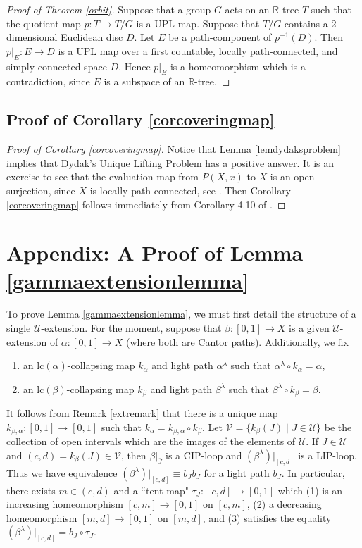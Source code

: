 \documentclass[12pt, leqno]{amsart}
\newcommand{\light}{\lambda}
\newcommand{\ui}{[0,1]}
\newcommand{\scru}{\mathscr{U}}
\newcommand{\scrv}{\mathscr{V}}
\newcommand{\ov}{\overline}
\newcommand{\lc}{\text{lc}}
\theoremstyle{definition}\newtheorem{definition}[theorem]{Definition}
\begin{document}
\begin{proof}[Proof of Theorem \ref{orbit}]
  Suppose that a group $G$ acts on an $\mathbb R$-tree $T$ such that the quotient map $p:T \to T/G$ is a UPL map.  Suppose that $T/G$ contains a 2-dimensional Euclidean disc $D$.  Let $E$ be a path-component of $p^{-1}(D)$.  Then $p|_{E}:E \to D$ is a UPL map over a first countable, locally path-connected, and simply connected space $D$.  Hence $p|_{E}$ is a homeomorphism which is a contradiction, since $E$ is a subspace of an $\mathbb R$-tree.
\end{proof}

\subsection{Proof of Corollary \ref{corcoveringmap}}

\begin{proof}[Proof of Corollary \ref{corcoveringmap}]
    Notice that Lemma \ref{lemdydaksproblem} implies that Dydak's Unique Lifting Problem has a positive answer.  It is an exercise to see that the evaluation map from $P(X,x)$ to $X$ is an open surjection, since $X$ is locally path-connected, see \cite[Section 2.1]{BM}.  Then Corollary \ref{corcoveringmap} follows immediately from Corollary 4.10 of \cite{BM}.
\end{proof}


\section{Appendix: A Proof of Lemma \ref{gammaextensionlemma}}\label{appendix}

To prove Lemma \ref{gammaextensionlemma}, we must first detail the structure of a single $\scru$-extension. For the moment, suppose that $\beta:\ui\to X$ is a given $\scru$-extension of $\alpha:\ui\to X$ (where both are Cantor paths). Additionally, we fix
\begin{enumerate}
\item an $\lc(\alpha)$-collapsing map $k_{\alpha}$ and light path $\alpha^{\light}$ such that $\alpha^{\light}\circ k_{\alpha}=\alpha$,
\item an $\lc(\beta)$-collapsing map $k_{\beta}$ and light path $\beta^{\light}$ such that $\beta^{\light}\circ k_{\beta}=\beta$.
\end{enumerate}
It follows from Remark \ref{extremark} that there is a unique map $k_{\beta,\alpha}:\ui\to \ui$ such that $k_{\alpha}=k_{\beta,\alpha}\circ k_{\beta}$. Let $\scrv=\{k_{\beta}(J)\mid J\in\scru\}$ be the collection of open intervals which are the images of the elements of $\scru$. If $J\in \scru$ and $(c,d)=k_{\beta}(J)\in \scrv$, then $\beta|_{\ov{J}}$ is a CIP-loop and $(\beta^{\light})|_{[c,d]}$ is a LIP-loop. Thus we have equivalence $(\beta^{\light})|_{[c,d]}\equiv b_{J} \ov{b_{J}}$ for a light path $b_J$. In particular, there exists $m\in (c,d)$ and a ``tent map" $\tau_J:[c,d]\to\ui$ which (1) is an increasing homeomorphism $[c,m]\to [0,1]$ on $[c,m]$, (2) a decreasing homeomorphism $[m,d]\to[0,1]$ on $[m,d]$, and (3) satisfies the equality $(\beta^{\light})|_{[c,d]}=b_J\circ \tau_J$.
\end{document}
